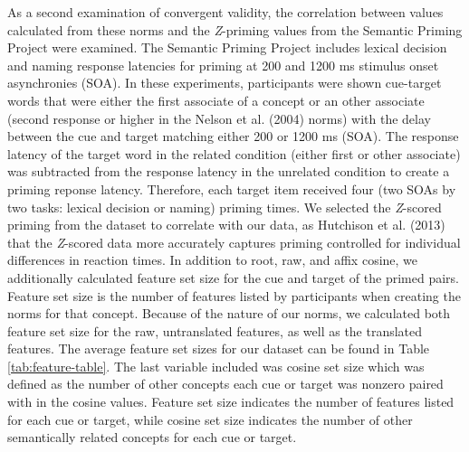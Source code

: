 \documentclass[english,,man]{apa6}
\theoremstyle{definition}
\theoremstyle{definition}
\theoremstyle{definition}
\theoremstyle{remark}
\begin{document}
As a second examination of convergent validity, the correlation between
values calculated from these norms and the \emph{Z}-priming values from
the Semantic Priming Project were examined. The Semantic Priming Project
includes lexical decision and naming response latencies for priming at
200 and 1200 ms stimulus onset asynchronies (SOA). In these experiments,
participants were shown cue-target words that were either the first
associate of a concept or an other associate (second response or higher
in the Nelson et al. (2004) norms) with the delay between the cue and
target matching either 200 or 1200 ms (SOA). The response latency of the
target word in the related condition (either first or other associate)
was subtracted from the response latency in the unrelated condition to
create a priming reponse latency. Therefore, each target item received
four (two SOAs by two tasks: lexical decision or naming) priming times.
We selected the \emph{Z}-scored priming from the dataset to correlate
with our data, as Hutchison et al. (2013) that the \emph{Z}-scored data
more accurately captures priming controlled for individual differences
in reaction times. In addition to root, raw, and affix cosine, we
additionally calculated feature set size for the cue and target of the
primed pairs. Feature set size is the number of features listed by
participants when creating the norms for that concept. Because of the
nature of our norms, we calculated both feature set size for the raw,
untranslated features, as well as the translated features. The average
feature set sizes for our dataset can be found in Table
\ref{tab:feature-table}. The last variable included was cosine set size
which was defined as the number of other concepts each cue or target was
nonzero paired with in the cosine values. Feature set size indicates the
number of features listed for each cue or target, while cosine set size
indicates the number of other semantically related concepts for each cue
or target.
\end{document}
